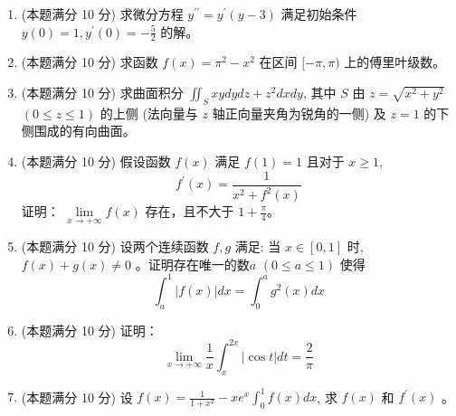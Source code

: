 \begin{enumerate}


\item 	
(本题满分 10 分)	
求微分方程 $y^{\prime \prime}=y^{\prime}(y-3)$ 满足初始条件 $y(0)=1, y^{\prime}(0)=-\frac{5}{2}$ 的解。




\item 	
(本题满分 10 分)	
求函数 $f(x)=\pi^{2}-x^{2}$ 在区间 $[-\pi, \pi)$ 上的傅里叶级数。




\item 	
(本题满分 10 分)	
求曲面积分 $\iint_{S} x y dy d z+z^{2} d x d y$, 其中 $S$ 由 $z=\sqrt{x^{2}+y^{2}}$ $(0 \leqslant z \leqslant 1)$ 的上侧 (法向量与 $z$ 轴正向量夹角为锐角的一侧) 及 $z=1$ 的下侧围成的有向曲面。





\item 	
(本题满分 10 分)	
假设函数 $f(x)$ 满足 $f(1)=1$ 且对于 $x \geqslant 1$,
\[ 
f^{\prime}(x)=\frac{1}{x^{2}+f^{2}(x)}
 \]
证明： $\lim\limits _{x \rightarrow +\infty} f(x)$ 存在，且不大于 $1+\frac{\pi}{4}$。



\newpage
\item 	
(本题满分 10 分)	
设两个连续函数 $f, g$ 满足: 当 $x \in[0,1]$ 时, $f(x)+g(x) \neq 0$ 。证明存在唯一的数$ a $ $(0 \leqslant a \leqslant 1)$ 使得
\[
\int_{a}^{1}|f(x)| d x=\int_{0}^{a} g^{2}(x) d x
\]





\item 	
(本题满分 10 分)	
证明：
\[
\lim _{x \rightarrow+\infty} \frac{1}{x} \int_{x}^{2 x}|\cos t| d t=\frac{2}{\pi}
\]




\item 	
(本题满分 10 分)	
设 $f(x)=\frac{1}{1+x^{2}}-x e^{x} \int_{0}^{1} f(x) d x$, 求 $f(x)$ 和 $f^{\prime}(x)$ 。



\end{enumerate}
